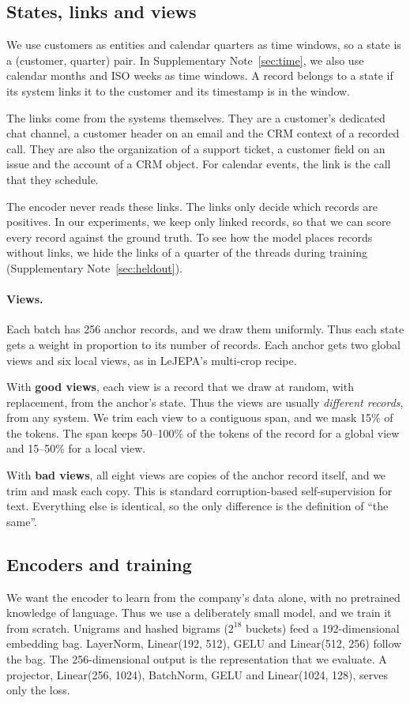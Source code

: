 \documentclass[11pt]{article}
\newcommand{\good}{\textcolor{goodblue}{\textbf{good views}}}
\begin{document}
\subsection{States, links and views}
We use customers as entities and calendar quarters as time windows, so a state is a (customer, quarter) pair. In Supplementary Note~\ref{sec:time}, we also use calendar months and ISO weeks as time windows. A record belongs to a state if its system links it to the customer and its timestamp is in the window.

The links come from the systems themselves. They are a customer's dedicated chat channel, a customer header on an email and the CRM context of a recorded call. They are also the organization of a support ticket, a customer field on an issue and the account of a CRM object. For calendar events, the link is the call that they schedule.

The encoder never reads these links. The links only decide which records are positives. In our experiments, we keep only linked records, so that we can score every record against the ground truth. To see how the model places records without links, we hide the links of a quarter of the threads during training (Supplementary Note~\ref{sec:heldout}).

\paragraph{Views.}
Each batch has 256 anchor records, and we draw them uniformly. Thus each state gets a weight in proportion to its number of records. Each anchor gets two global views and six local views, as in LeJEPA's multi-crop recipe.

With \good, each view is a record that we draw at random, with replacement, from the anchor's state. Thus the views are usually \emph{different records}, from any system. We trim each view to a contiguous span, and we mask 15\% of the tokens. The span keeps 50--100\% of the tokens of the record for a global view and 15--50\% for a local view.

With \textcolor{badorange}{\textbf{bad views}}, all eight views are copies of the anchor record itself, and we trim and mask each copy. This is standard corruption-based self-supervision for text. Everything else is identical, so the only difference is the definition of ``the same''.

\subsection{Encoders and training}
We want the encoder to learn from the company's data alone, with no pretrained knowledge of language. Thus we use a deliberately small model, and we train it from scratch. Unigrams and hashed bigrams ($2^{18}$ buckets) feed a 192-dimensional embedding bag. LayerNorm, Linear(192, 512), GELU and Linear(512, 256) follow the bag. The 256-dimensional output is the representation that we evaluate. A projector, Linear(256, 1024), BatchNorm, GELU and Linear(1024, 128), serves only the loss.
\end{document}
